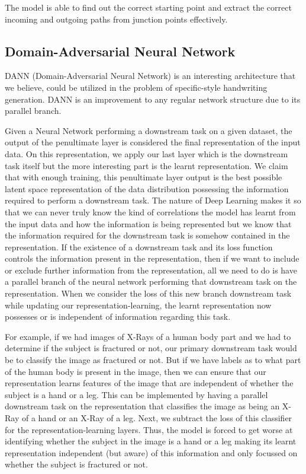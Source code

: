\documentclass[10pt,twocolumn,letterpaper]{article}
\begin{document}
The model is able to find out the correct starting point and extract the correct incoming and outgoing paths from junction points effectively. 


\subsection{Domain-Adversarial Neural Network}
\label{subsec: DANN}

DANN (Domain-Adversarial Neural Network) \cite{DANN} is an interesting architecture that we believe, could be utilized in the problem of specific-style handwriting generation. DANN is an improvement to any regular network structure due to its parallel branch.

Given a Neural Network performing a downstream task on a given dataset, the output of the penultimate layer is considered the final representation of the input data. On this representation, we apply our last layer which is the downstream task itself but the more interesting part is the learnt representation. We claim that with enough training, this penultimate layer output is the best possible latent space representation of the data distribution possessing the information required to perform a downstream task. The nature of Deep Learning makes it so that we can never truly know the kind of correlations the model has learnt from the input data and how the information is being represented but we know that the information required for the downstream task is somehow contained in the representation. If the existence of a downstream task and its loss function controls the information present in the representation, then if we want to include or exclude further information from the representation, all we need to do is have a parallel branch of the neural network performing that downstream task on the representation. When we consider the loss of this new branch downstream task while updating our representation-learning, the learnt representation now possesses or is independent of information regarding this task.

For example, if we had images of X-Rays of a human body part and we had to determine if the subject is fractured or not, our primary downstream task would be to classify the image as fractured or not. But if we have labels as to what part of the human body is present in the image, then we can ensure that our representation learns features of the image that are independent of whether the subject is a hand or a leg. This can be implemented by having a parallel downstream task on the representation that classifies the image as being an X-Ray of a hand or an X-Ray of a leg. Next, we subtract the loss of this classifier for the representation-learning layers. Thus, the model is forced to get worse at identifying whether the subject in the image is a hand or a leg making its learnt representation independent (but aware) of this information and only focussed on whether the subject is fractured or not.
\end{document}
